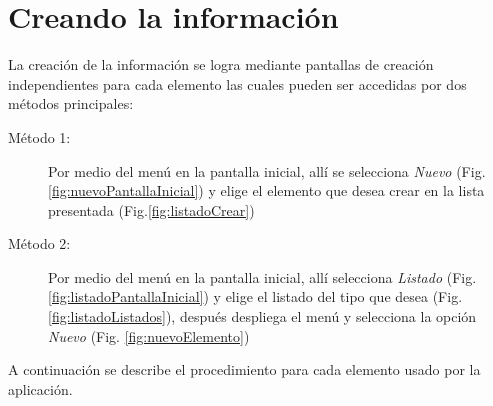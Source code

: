 \chapter{Creando la informaci\'on}
\label{sec:creandoLaInformacion}
La creaci\'on de la informaci\'on se logra mediante pantallas de creaci\'on
independientes para cada elemento las cuales pueden ser accedidas por dos
m\'etodos principales:

\begin{description}
  \item[M\'etodo 1:]Por medio del men\'u \blackberry en la pantalla inicial,
  all\'i se selecciona \textit{Nuevo} (Fig.\ref{fig:nuevoPantallaInicial}) y
elige el elemento que desea crear en la lista
presentada (Fig.\ref{fig:listadoCrear})

  \item[M\'etodo 2:]Por medio del men\'u \blackberry en la pantalla inicial,
  all\'i selecciona \textit{Listado} (Fig.\ref{fig:listadoPantallaInicial}) y
elige el listado del tipo que desea (Fig. \ref{fig:listadoListados}),
  despu\'es despliega el men\'u \blackberry y selecciona la opci\'on
\emph{Nuevo} (Fig. \ref{fig:nuevoElemento})
\end{description}

A continuaci\'on se describe el procedimiento para cada elemento usado por la
aplicaci\'on.












